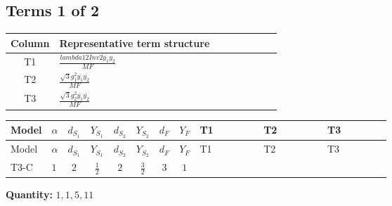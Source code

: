 \documentclass[8pt]{article}
\begin{document}
\begin{landscape}
\subsection*{Terms 1 of 2}
\begin{center}
\begin{tabular}{@{}c >{\raggedright\arraybackslash}p{0.82\linewidth}@{}}
\toprule
Column & Representative term structure \\
\midrule
T1 & \(\displaystyle \frac{lambda12Inv2 \overline{y_{1}} \overline{y_{2}}}{MF}\) \\
\midrule
T2 & \(\displaystyle \frac{\sqrt{3} g_{1}^{2} \overline{y_{1}} \overline{y_{2}}}{MF}\) \\
\midrule
T3 & \(\displaystyle \frac{\sqrt{3} g_{2}^{2} \overline{y_{1}} \overline{y_{2}}}{MF}\) \\
\midrule
\bottomrule
\end{tabular}
\end{center}
\smallskip
\tiny
\begin{longtable}{@{}llcccccc >{\raggedright\arraybackslash}p{0.21\linewidth} >{\raggedright\arraybackslash}p{0.21\linewidth} >{\raggedright\arraybackslash}p{0.21\linewidth}@{}}
\toprule
Model & $\alpha$ & $d_{S_1}$ & $Y_{S_1}$ & $d_{S_2}$ & $Y_{S_2}$ & $d_F$ & $Y_F$ & T1 & T2 & T3 \\
\midrule
\endfirsthead
\toprule
Model & $\alpha$ & $d_{S_1}$ & $Y_{S_1}$ & $d_{S_2}$ & $Y_{S_2}$ & $d_F$ & $Y_F$ & T1 & T2 & T3 \\
\midrule
\endhead
T3-C & $1$ & $2$ & $\frac{1}{2}$ & $2$ & $\frac{3}{2}$ & $3$ & $1$ & \scriptsize\adjustbox{max width=\linewidth}{$\begin{gathered} \frac{lambda12Inv2 \overline{y_{1}} \overline{y_{2}}}{3 MF}\end{gathered}$} & \scriptsize\adjustbox{max width=\linewidth}{$\begin{gathered} \frac{\sqrt{3} g_{1}^{2} \overline{y_{1}} \overline{y_{2}}}{2 MF}\end{gathered}$} & \scriptsize\adjustbox{max width=\linewidth}{$\begin{gathered} \frac{\sqrt{3} g_{2}^{2} \overline{y_{1}} \overline{y_{2}}}{4 MF}\end{gathered}$} \\
\midrule
\bottomrule
\end{longtable}
\clearpage
\noindent\textbf{Quantity: }$\mathrm{1,1,5,11}$\par\smallskip

\end{landscape}
\end{document}
